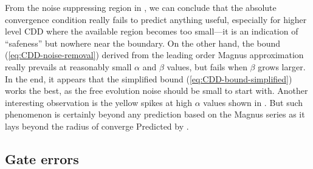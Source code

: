 \documentclass[aps,pra,reprint,superscriptaddress]{revtex4-2}
\begin{document}
From the noise suppressing region in , we can conclude that the absolute convergence condition really fails to predict anything useful, especially for higher level CDD where the available region becomes too small---it is an indication of ``safeness'' but nowhere near the boundary. On the other hand, the bound (\ref{eq:CDD-noise-removal}) derived from the leading order Magnus approximation really prevails at reasonably small $\alpha$ and $\beta$ values, but fails when $\beta$ grows larger. In the end, it appears that the simplified bound (\ref{eq:CDD-bound-simplified}) works the best, as the free evolution noise should be small to start with. 
Another interesting observation is the yellow spikes at high $\alpha$ values shown in . But such phenomenon is certainly beyond any prediction based on the Magnus series as it lays beyond the radius of converge Predicted by .

\subsection{Gate errors}
\end{document}
